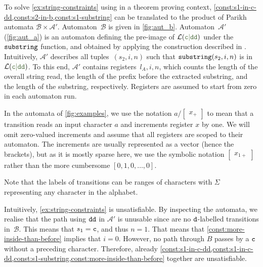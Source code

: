 To solve \cref{ex:string-constraints} using \Calculus{} in a theorem
proving context,
\cref{const:s1-in-c-dd,const:s2-in-b,const:s1-substring} can be
translated to the product of Parikh automata $\mathcal{B} \times
\mathcal{A}'$. Automaton~$\mathcal{B}$ is given in \cref{fig:aut_b}.  Automaton~$\mathcal{A}'$
(\cref{fig:aut_a}) is an automaton defining the pre-image of
$\Language(\Regex{c\RegexOr{}dd})$ under the $\operatorname{\mathtt{substring}}$ function,
and obtained by applying the construction described in
\cite{ostrich-plus}. Intuitively, $\mathcal{A}'$ describes all
tuples~$(s_2, i, n)$ such that $\operatorname{\mathtt{substring}}(s_2, i, n)$ is in
$\Language(\Regex{c\RegexOr{}dd})$. To this end, $\mathcal{A}'$ contains
registers~$l_A, i, n$, which counts the length of the overall string
read, the length of the prefix before the extracted substring, and the
length of the substring, respectively. Registers are assumed to start
from zero in each automaton run.

In the automata of \cref{fig:examples}, we use the notation $a /
\begin{bmatrix} x_+ \end{bmatrix}$ to mean that a transition reads an input
character $a$ and increments register $x$ by one. We will omit zero-valued
increments and assume that all registers are scoped to their automaton. The
increments are usually represented as a vector (hence the brackets), but as it
is mostly sparse here, we use the symbolic notation $\begin{bmatrix} x_{1+}
\end{bmatrix}$ rather than the more cumbersome $\left[ 0, 1,  0 , \ldots, 0
\right]$.

Note that the labels of transitions can be ranges of characters with $\Sigma$
representing any character in the alphabet.

Intuitively, \cref{ex:string-constraints} is unsatisfiable. By inspecting the
automata, we realise that the path using $\texttt{dd}$ in $\mathcal{A}'$ is unusable since
are no $\texttt{d}$-labelled transitions in~$\mathcal{B}$. This means that $s_1 = \texttt{c}$,
and thus $n = 1$. That means that \cref{const:more-inside-than-before} implies
that $i = 0$. However, no path through $B$ passes by a $\texttt{c}$ without a
preceding character. Therefore, already
\cref{const:s1-in-c-dd,const:s1-in-c-dd,const:s1-substring,const:more-inside-than-before}
together are unsatisfiable.


